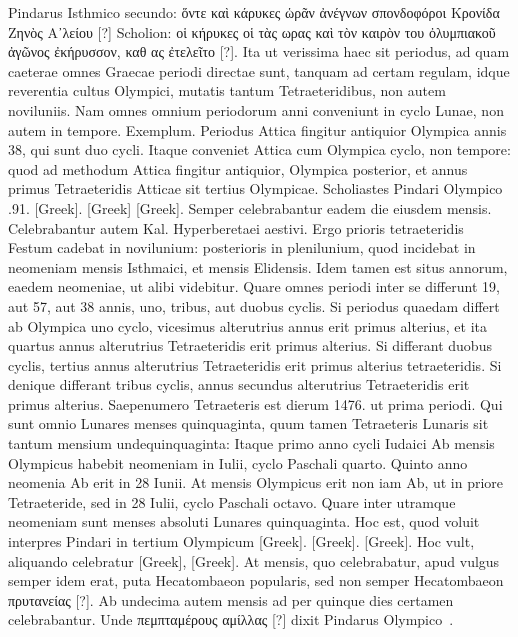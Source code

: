 Pindarus Isthmico secundo:
\textgreek{ὅντε καὶ κάρυκες ὡρᾶν ἀνέγνων σπονδοφόροι Κρονίδα Ζηνὸς Α᾽λείου [?]}
Scholion: \textgreek{οἱ κήρυκες οἱ τὰς ωρας καὶ τὸν καιρὸν του ὀλυμπιακοῦ ἀγῶνος
ἐκήρυσσον, καθ ας ἐτελεῖτο [?]}.
Ita ut verissima haec sit periodus, ad
quam caeterae omnes Graecae periodi directae sunt, tanquam ad certam
regulam, idque reverentia cultus Olympici, mutatis tantum Tetraeteridibus,
non autem noviluniis.
Nam omnes omnium periodorum anni
conveniunt in cyclo Lunae, non autem in tempore.
Exemplum.
Periodus
Attica fingitur antiquior Olympica annis 38, qui sunt duo cycli.
Itaque conveniet Attica cum Olympica cyclo, non tempore: quod
ad methodum Attica fingitur antiquior, Olympica posterior, et annus
primus Tetraeteridis Atticae sit tertius Olympicae.
Scholiastes Pindari
Olympico .91. \textgreek{[Greek]}.
\textgreek{[Greek]}
\textgreek{[Greek]}.
Semper celebrabantur eadem die
eiusdem mensis.
Celebrabantur autem Kal. Hyperberetaei aestivi.
Ergo
prioris tetraeteridis Festum cadebat in novilunium: posterioris in plenilunium,
quod incidebat in neomeniam mensis Isthmaici, et  mensis
Elidensis.
Idem tamen est situs annorum, eaedem neomeniae, ut alibi
videbitur.
Quare omnes periodi inter se differunt 19, aut 57, aut 38
annis, uno, tribus, aut duobus cyclis.
Si periodus quaedam differt ab
Olympica uno cyclo, vicesimus alterutrius annus erit primus alterius,
et ita quartus annus alterutrius Tetraeteridis erit primus alterius.
Si differant
duobus cyclis, tertius annus alterutrius Tetraeteridis erit primus
alterius tetraeteridis.
Si denique differant tribus cyclis, annus secundus
alterutrius Tetraeteridis erit primus alterius.
Saepenumero Tetraeteris
est dierum 1476. ut prima periodi.
Qui sunt omnio Lunares
menses quinquaginta, quum tamen Tetraeteris Lunaris sit tantum
mensium undequinquaginta: Itaque primo anno cycli Iudaici Ab mensis
Olympicus habebit neomeniam in  Iulii, cyclo Paschali quarto.
Quinto
anno neomenia Ab erit in 28 Iunii.
At mensis Olympicus erit non iam
Ab, ut in priore Tetraeteride, sed in 28 Iulii, cyclo Paschali octavo.
Quare inter utramque neomeniam sunt menses absoluti
 Lunares quinquaginta.
Hoc est, quod voluit interpres Pindari in tertium Olympicum
\textgreek{[Greek]}.
\textgreek{[Greek]}.
\textgreek{[Greek]}.
Hoc
vult, aliquando celebratur \textgreek{[Greek]}, \textgreek{[Greek]}.
At mensis, quo celebrabatur, apud vulgus semper
idem erat, puta Hecatombaeon popularis, sed non semper Hecatombaeon
\textgreek{πρυτανείας [?]}.
Ab undecima autem mensis ad  per quinque
dies certamen celebrabantur.
Unde \textgreek{πεμπταμέρους αμίλλας [?]} dixit Pindarus
Olympico~.

